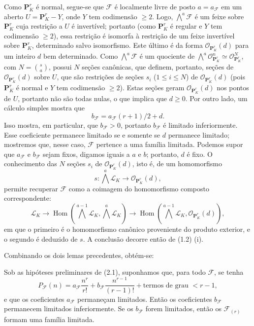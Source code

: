 Como $\mathbf P^r_K$ é normal, segue-se que $\mathcal F$ é localmente livre de
posto $a=a_{\mathcal F}$ em um aberto $U=\mathbf P^r_K-Y$, onde $Y$ tem
codimensão $\geq2$. Logo, $\bigwedge^a\mathcal F$ é um feixe sobre
$\mathbf P^r_K$ cuja restrição a $U$ é invertível; portanto (como
$\mathbf P^r_K$ é regular e $Y$ tem codimensão $\geq2$), essa restrição é
isomorfa à restrição de um feixe invertível sobre $\mathbf P^r_K$, determinado
salvo isomorfismo. Este último é da forma $\mathcal O_{\mathbf P^r_K}(d)$ para um
inteiro $d$ bem determinado. Como $\bigwedge^a\mathcal F$ é um quociente de
$\bigwedge^a\mathcal O_{\mathbf P^r_K}^{n}\simeq
\mathcal O_{\mathbf P^r_K}^{N}$, com $N=\binom{s}{a}$, possui $N$ seções canônicas,
que definem, portanto, seções de
$\mathcal O_{\mathbf P^r_K}(d)$ sobre $U$, que são restrições de seções
$s_i$ ($1\leq i\leq N$) de $\mathcal O_{\mathbf P^r_K}(d)$ (pois
$\mathbf P^r_K$ é normal e $Y$ tem codimensão $\geq2$). Estas seções
geram $\mathcal O_{\mathbf P^r_K}(d)$ nos pontos de $U$, portanto não são
todas nulas, o que implica que $d\geq0$. Por outro lado, um cálculo simples
mostra que
\[
b_{\mathcal F}=a_{\mathcal F}(r+1)/2+d.
\]
Isso mostra, em particular, que $b_{\mathcal F}>0$, portanto
$b_{\mathcal F}$ é limitado inferiormente. Esse coeficiente permanece limitado
se e somente se $d$ permanece limitado; mostremos que, nesse caso, $\mathcal F$
pertence a uma família limitada. Podemos supor que $a_{\mathcal F}$ e
$b_{\mathcal F}$ sejam fixos, digamos iguais a $a$ e $b$; portanto, $d$ é fixo.
O conhecimento das $N$ seções
$s_i$ de $\mathcal O_{\mathbf P^r_K}(d)$, isto é, de um homomorfismo
\[
s:\bigwedge^a\mathcal L_K\longrightarrow\mathcal O_{\mathbf P^r_K}(d),
\]
permite recuperar $\mathcal F$ como a coimagem do homomorfismo composto
correspondente:
\[
\mathcal L_K\longrightarrow
\operatorname{Hom}\!\left(\bigwedge^{a-1}\mathcal L_K,
\bigwedge^a\mathcal L_K\right)\longrightarrow
\operatorname{Hom}\!\left(\bigwedge^{a-1}\mathcal L_K,
\mathcal O_{\mathbf P^r_K}(d)\right),
\]
em que o primeiro é o homomorfismo canônico proveniente do produto exterior, e
o segundo é deduzido de $s$. A conclusão decorre então de (1.2) (i).

Combinando os dois lemas precedentes, obtém-se:

 Sob as hipóteses preliminares de (2.1), suponhamos que, para
todo $\mathcal F$, se tenha
\[
P_{\mathcal F}(n)=a_{\mathcal F}\frac{n^r}{r!}
+b_{\mathcal F}\frac{n^{r-1}}{(r-1)!}
+\text{termos de grau $<r-1$},
\]
e que os coeficientes $a_{\mathcal F}$ permaneçam limitados. Então os
coeficientes $b_{\mathcal F}$ permanecem limitados inferiormente. Se os
$b_{\mathcal F}$ forem limitados, então os $\mathcal F_{(r)}$ formam uma família
limitada.

